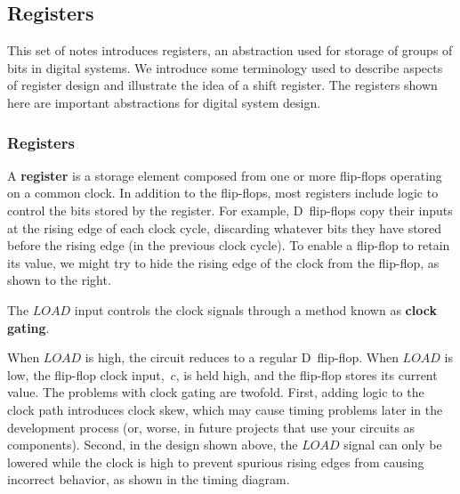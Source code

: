 \classtitle

\subsection{Registers}

This set of notes introduces registers, an abstraction used for 
storage of groups of bits in digital systems.  We introduce some
terminology used to describe aspects of register design and
illustrate the idea of a shift register.  The registers shown here
are important abstractions for digital system design.\\
%
%

\subsubsection{Registers}

\begin{minipage}{2.85in}
A {\bf register} is a storage element composed from one or more
flip-flops operating on a common clock.
%
In addition to the flip-flops,
most registers include logic to control the bits stored by the register.
%
For example, D~flip-flops 
copy their inputs at the rising edge of each clock cycle,
discarding whatever bits they have stored before the rising edge
(in the previous clock cycle).
%
To enable a flip-flop to retain its value, we might try to hide the 
rising edge of the clock from the flip-flop, as shown to the right.\mpline

The $LOAD$ input controls the clock signals through a method known as
{\bf clock gating}.\linebreak
\end{minipage}\hspace{.25in}%
\begin{minipage}{3.4in}
\centerline{}\vspace{18pt}
\vspace{12pt}
\end{minipage}\mpdone

When $LOAD$ is high, the circuit reduces to a
regular D~flip-flop.  When $LOAD$ is low, the flip-flop clock 
input,~$c$, is held high, and the flip-flop stores its 
current value.
%
The problems with clock gating are twofold.  First, adding logic to
the clock path introduces clock skew, which may cause timing problems
later in the development process (or, worse, in future projects that
%
use your circuits as components).  Second, in the design shown above,
the $LOAD$ signal
can only be lowered while the clock is high to prevent spurious rising
edges from causing incorrect behavior, as shown in the timing diagram.

